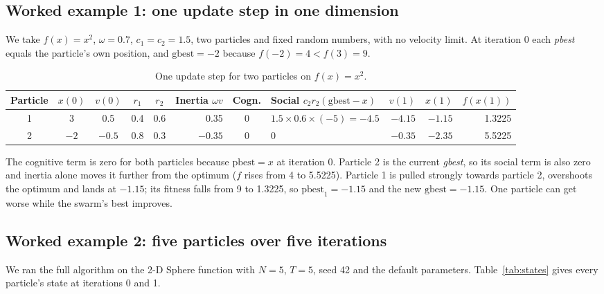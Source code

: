 \documentclass[11pt,a4paper]{article}
\newcommand{\pb}{\mathrm{pbest}}
\newcommand{\gb}{\mathrm{gbest}}
\newcommand{\tn}[1]{\textit{#1}}
\begin{document}
\subsection{Worked example 1: one update step in one dimension}
We take $f(x)=x^2$, $\omega=0.7$, $c_1=c_2=1.5$, two particles and fixed random numbers, with no velocity limit. At iteration 0 each \tn{pbest} equals the particle's own position, and $\gb=-2$ because $f(-2)=4<f(3)=9$.

\begin{table}[ht]
\centering
\caption{One update step for two particles on $f(x)=x^2$.}\label{tab:step}
\footnotesize
\setlength{\tabcolsep}{3pt}
\begin{tabular}{@{}cccccrcp{3.4cm}rrr@{}}
\toprule
\textbf{Particle} & $x(0)$ & $v(0)$ & $r_1$ & $r_2$ & Inertia $\omega v$ & Cogn. & Social $c_2r_2(\gb-x)$ & $v(1)$ & $x(1)$ & $f(x(1))$\\
\midrule
1 & 3 & 0.5 & 0.4 & 0.6 & 0.35 & 0 & $1.5\times0.6\times(-5)=-4.5$ & $-4.15$ & $-1.15$ & 1.3225\\
2 & $-2$ & $-0.5$ & 0.8 & 0.3 & $-0.35$ & 0 & 0 & $-0.35$ & $-2.35$ & 5.5225\\
\bottomrule
\end{tabular}
\end{table}

The cognitive term is zero for both particles because $\pb=x$ at iteration 0. Particle 2 is the current \tn{gbest}, so its social term is also zero and inertia alone moves it further from the optimum ($f$ rises from 4 to 5.5225). Particle 1 is pulled strongly towards particle 2, overshoots the optimum and lands at $-1.15$; its fitness falls from 9 to 1.3225, so $\pb_1=-1.15$ and the new $\gb=-1.15$. One particle can get worse while the swarm's best improves.

\subsection{Worked example 2: five particles over five iterations}\label{sec:five}
We ran the full algorithm on the 2-D Sphere function with $N=5$, $T=5$, seed 42 and the default parameters. Table~\ref{tab:states} gives every particle's state at iterations 0 and 1.
\end{document}
